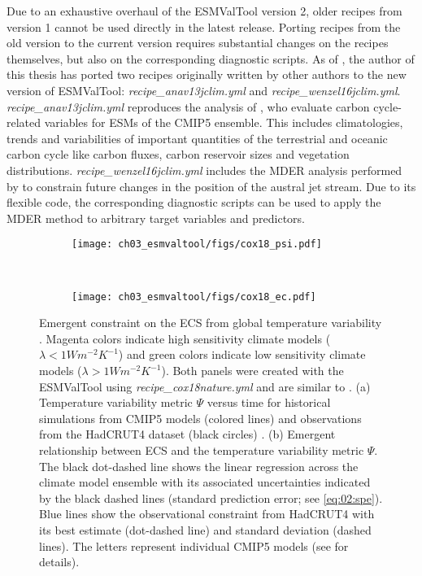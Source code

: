 Due to an exhaustive overhaul of the \ac{ESMValTool} version 2, older recipes
from version 1 \autocite{Eyring2016a} cannot be used directly in the latest
release. Porting recipes from the old version to the current version requires
substantial changes on the recipes themselves, but also on the corresponding
diagnostic scripts. As of \TheMonth{}, the author of this thesis has ported two
recipes originally written by other authors to the new version of
\ac{ESMValTool}: \emph{recipe\_anav13jclim.yml} and
\emph{recipe\_wenzel16jclim.yml}. \emph{recipe\_anav13jclim.yml} reproduces the
analysis of \textcite{Anav2013}, who evaluate carbon cycle-related variables
for \acp{ESM} of the \acs{CMIP}5 ensemble. This includes climatologies, trends
and variabilities of important quantities of the terrestrial and oceanic carbon
cycle like carbon fluxes, carbon reservoir sizes and vegetation distributions.
\emph{recipe\_wenzel16jclim.yml} includes the \ac{MDER} analysis performed by
\textcite{Wenzel2016a} to constrain future changes in the position of the
austral jet stream. Due to its flexible code, the corresponding diagnostic
scripts can be used to apply the \ac{MDER} method to arbitrary target variables
and predictors.

\begin{figure}[t]
  \centering
  \begin{subfigure}[b]{\SubfigureWidth{}}
    \texttt{[image: ch03\_esmvaltool/figs/cox18\_psi.pdf]}
    \caption{}
    \label{fig:03:cox18:a}
  \end{subfigure}
  ~
  \begin{subfigure}[b]{\SubfigureWidth{}}
    \texttt{[image: ch03\_esmvaltool/figs/cox18\_ec.pdf]}
    \caption{}
    \label{fig:03:cox18:b}
  \end{subfigure}
  \caption{Emergent constraint on the \acf{ECS} from global temperature
    variability \autocite{Cox2018}. Magenta colors indicate high sensitivity
    climate models ($\lambda < 1 \unit{W m^{-2} K^{-1}}$) and green colors
    indicate low sensitivity climate models ($\lambda > 1 \unit{W m^{-2}
      K^{-1}}$). Both panels were created with the \acs{ESMValTool} using
    \emph{recipe\_cox18nature.yml} and are similar to \textcite{Cox2018}. (a)
    Temperature variability metric $\Psi$ versus time for historical
    simulations from \acs{CMIP}5 models (colored lines) and observations from
    the HadCRUT4 dataset (black circles) \autocite{Morice2012}. (b) Emergent
    relationship between \acs{ECS} and the temperature variability metric
    $\Psi$. The black dot-dashed line shows the linear regression across the
    climate model ensemble with its associated uncertainties indicated by the
    black dashed lines (standard prediction error; see \cref{eq:02:spe}). Blue
    lines show the observational constraint from HadCRUT4 with its best
    estimate (dot-dashed line) and standard deviation (dashed lines). The
    letters represent individual \acs{CMIP}5 models (see \textcite{Cox2018}
    for details).}
  \label{fig:03:cox18}
\end{figure}

